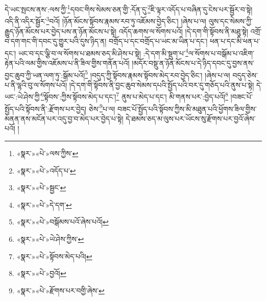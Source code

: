 དེ་ཡང་སྤངས་ནས་:ལས་ཀྱི་\footnote{«སྣར་»«པེ་»ལས་ཀྱིས་}དབང་གིས་སེམས་ཅན་གྱི་:དོན་དུ་\footnote{«སྣར་»«པེ་»འདོད་པ་}ཇི་ལྟར་འདོད་པ་བཞིན་དུ་ངེས་པར་སྦྱོར་བ་སྟེ། འདི་ནི་འདིར་སྦྱོར་\footnote{«སྣར་»«པེ་»སྦྱང་}བའོ། །ཉོན་མོངས་སྟོབས་རྣམས་རབ་ཏུ་འཇོམས་བྱེད་ཅིང་། །ཞེས་པ་ལ། ལུས་དང་སེམས་ཀྱི་རྒྱུད་ཉོན་མོངས་པར་བྱེད་པས་ན་ཉོན་མོངས་པ་སྟེ། འདོད་ཆགས་ལ་སོགས་པའོ། །དེ་དག་གི་སྟོབས་ནི་མཐུ་སྟེ། འགྲོ་བ་དག་གང་གི་དབང་དུ་གྱུར་པའི་དུས་ཉིད་ན། བགྲོད་པ་དང་བགྲོད་པ་ཡང་མ་ཡིན་པ་དང་། ཕན་པ་དང་མི་ཕན་པ་དང་། ཡང་བ་དང་ལྕི་བ་ལ་སོགས་པ་ཐམས་ཅད་མི་ཤེས་པ་སྟེ། :དེ་དག་མི་སྡུག་པ་\footnote{«སྣར་»«པེ་»དེ་དག་}ལ་སོགས་པ་བསྒོམ་པ་འཇིག་རྟེན་པའི་ལམ་གྱིས་འཇོམས་པ་ནི་ཟིལ་གྱིས་གནོན་པའོ། །མདོར་བསྡུ་ན་ཉོན་མོངས་པ་དེ་ཉིད་དབང་དུ་བྱས་ནས་བྱང་ཆུབ་ཀྱི་ཡན་ལག་ཏུ་:སྒོམ་པའོ།\footnote{«སྣར་»«པེ་»བསྒོམས་པའོ་ཞེས་པའོ།} །བདུད་ཀྱི་སྟོབས་རྣམས་སྟོབས་མེད་རབ་བྱེད་ཅིང་། །ཞེས་པ་ལ། བདུད་ཅེས་པ་ནི་ལྷའི་བུ་ལ་སོགས་པའོ། །དེ་དག་གི་སྟོབས་ནི་བྱང་ཆུབ་སེམས་དཔའི་སྤྱོད་པའི་བར་དུ་གཅོད་པའི་ནུས་པ་སྟེ། དེ་ཡང་:ཡེ་ཤེས་ཀྱི་\footnote{«སྣར་»«པེ་»ཡེ་ཤེས་ཀྱིས་}སྟོབས་:ཀྱིས་སྟོབས་མེད་པ་དང་།\footnote{«སྣར་»«པེ་»སྟོབས་མེད་པའི།} ནུས་པ་མེད་པ་དང་། མི་གནས་པར་:བྱེད་པའོ།\footnote{«སྣར་»«པེ་»བྱའོ།} །བཟང་པོ་སྤྱོད་པའི་སྟོབས་ནི་:རྫོགས་པར་བྱེད། ཅེས་\footnote{«སྣར་»«པེ་»རྫོགས་པར་བགྱི་ཞེས་}པ་ལ། བཟང་པོ་སྤྱོད་པའི་སྟོབས་ཀྱིས་མི་མཐུན་པའི་ཕྱོགས་ཟིལ་གྱིས་མནན་ནས་མངོན་པར་འདུ་བྱ་བ་མེད་པར་བྱེད་པ་སྟེ། དེ་ཐམས་ཅད་མ་ལུས་པར་ཡོངས་སུ་རྫོགས་པར་བྱའོ་ཞེས་པའོ། །
